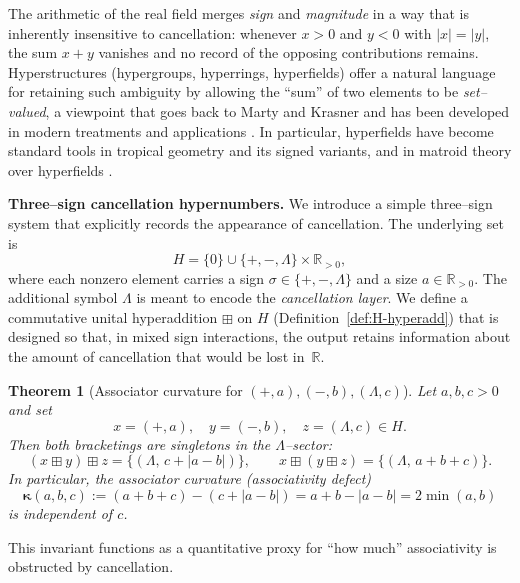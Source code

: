 \documentclass[11pt]{amsart}
\numberwithin{equation}{section}
\newtheorem{theorem}{Theorem}[section]
\theoremstyle{definition}
\theoremstyle{remark}
\newcommand{\R}{\mathbb{R}}
\newcommand{\Rp}{\mathbb{R}_{>0}}
\newcommand{\Hnum}{H}                      %
\newcommand{\AssocCurv}{\boldsymbol{\kappa}} %
\newcommand{\op}{\boxplus}                 %
\begin{document}
The arithmetic of the real field merges \emph{sign} and \emph{magnitude} in a way
that is inherently insensitive to cancellation: whenever $x>0$ and $y<0$ with
$|x|=|y|$, the sum $x+y$ vanishes and no record of the opposing contributions
remains.  Hyperstructures (hypergroups, hyperrings, hyperfields) offer a natural
language for retaining such ambiguity by allowing the ``sum'' of two elements to
be \emph{set--valued}, a viewpoint that goes back to Marty and Krasner and has
been developed in modern treatments and applications
\cite{Marty1934Hypergroup,Golzio2018Survey,Krasner1983Hyperrings,Vougiouklis1994Hyperstructures,CorsiniLeoreanu2003Applications,DavvazLeoreanuFotea2007HyperringTheory,ConnesConsani2010Monoids,Jun2018AGHyperrings,Viro2010Hyperfields}.
In particular, hyperfields have become standard tools in tropical geometry and
its signed variants, and in matroid theory over hyperfields
\cite{BakerBowler2019MatroidsHyperfields,Lorscheid2022TropicalHyperfield,MaxwellSmith2024Extensions}.

\medskip
\noindent\textbf{Three--sign cancellation hypernumbers.}
We introduce a simple three--sign system that explicitly records the appearance
of cancellation.  The underlying set is
\[
H=\{0\}\cup\{+,-,\Lambda\}\times\Rp,
\]
where each nonzero element carries a sign $\sigma\in\{+,-,\Lambda\}$ and a size
$a\in\Rp$.  The additional symbol $\Lambda$ is meant to encode the
\emph{cancellation layer}.  We define a commutative unital hyperaddition
$\boxplus$ on $H$ (Definition~\ref{def:H-hyperadd}) that is designed so that, in
mixed sign interactions, the output retains information about the amount of
cancellation that would be lost in~$\R$.

\medskip
\begin{theorem}[Associator curvature for $(+,a),(-,b),(\Lambda,c)$]
\label{thm:intro-defect}
Let $a,b,c>0$ and set
\[
  x=(+,a),\quad y=(-,b),\quad z=(\Lambda,c)\in\Hnum.
\]
Then both bracketings are singletons in the $\Lambda$--sector:
\[
  (x\op y)\op z = \{(\Lambda,\,c+|a-b|)\},\qquad
  x\op (y\op z) = \{(\Lambda,\,a+b+c)\}.
\]
In particular, the associator curvature (associativity defect)
\[
  \AssocCurv(a,b,c):=(a+b+c)-(c+|a-b|)=a+b-|a-b|=2\min(a,b)
\]
is independent of $c$.
\end{theorem}

This invariant functions as a quantitative proxy for ``how much'' associativity
is obstructed by cancellation.
\end{document}
